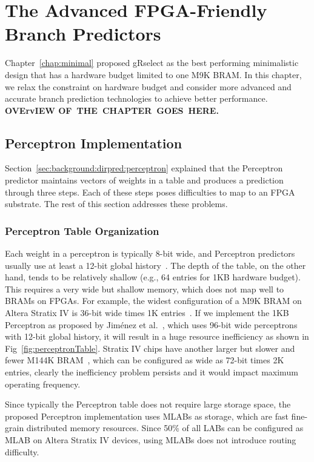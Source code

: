 \chapter{The Advanced FPGA-Friendly Branch Predictors}
\label{chap:advanced}

Chapter~\ref{chap:minimal} proposed gRselect as the best performing minimalistic design that has a hardware budget limited to one M9K BRAM. In this chapter, we relax the constraint on hardware budget and consider more advanced and accurate branch prediction technologies to achieve better performance.
\textbf{OVErvIEW OF\ THE\ CHAPTER\ GOES\ HERE.}
\section{Perceptron Implementation}
\label{sec:advanced:perceptron}
Section~\ref{sec:background:dirpred:perceptron} explained that the Perceptron predictor maintains vectors of weights in a table and produces a prediction through three steps. Each of these steps poses difficulties to map to an FPGA substrate. The rest of this section addresses these problems.

\subsection{Perceptron Table Organization}
\label{sec:advanced:perceptron:table}
Each weight in a perceptron is typically 8-bit wide, and Perceptron predictors usually use at least a 12-bit global history~\cite{perceptron}. The depth of the table, on the other hand, tends to be relatively shallow (e.g., 64 entries for 1KB hardware budget). This requires a very wide but shallow memory, which does not map well to BRAMs on FPGAs. For example, the widest configuration of a M9K BRAM on Altera Stratix IV is 36-bit wide times 1K entries~\cite{StratixIVM9K}. If we implement the 1KB Perceptron as proposed by Jim\'enez et al.~\cite{perceptron}, which uses 96-bit wide perceptrons with 12-bit global history, it will result in a huge resource inefficiency as shown in Fig~\ref{fig:perceptronTable}. Stratix IV chips have another larger but slower and fewer M144K BRAM~\cite{StratixIVM9K}, which can be configured as wide as 72-bit times 2K entries, clearly the inefficiency problem persists and it would impact maximum operating frequency.

Since typically the Perceptron table does not require large storage space, the proposed Perceptron implementation uses MLABs as storage, which are fast fine-grain distributed memory resources. Since 50\% of all LABs can be configured as MLAB on Altera Stratix IV devices, using MLABs does not introduce routing difficulty.


